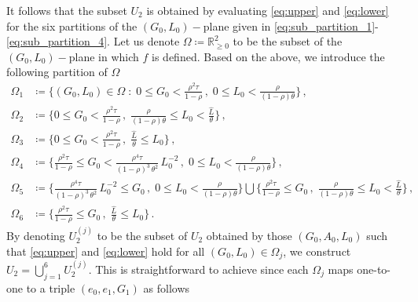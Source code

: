 \documentclass[a4paper,fleqn]{cas-sc}
\begin{document}
It follows that the subset $U_2$ is obtained by evaluating \eqref{eq:upper} and \eqref{eq:lower} for the six partitions of the $(G_0,L_0)-$plane given in \eqref{eq:sub_partition_1}-\eqref{eq:sub_partition_4}.
Let us denote $\Omega\coloneqq\mathbb{R}^2_{\geq0}$ to be the subset of the $(G_0,L_0)-$plane in which $f$ is defined.
Based on the above, we introduce the following partition of $\Omega$
%
\begin{subequations}\label{eq:partition_omega}
    \begin{align}
        \Omega_1&\coloneqq\bigg\{(G_0,L_0)\in\Omega\;:\; 0 \leq G_0 < \frac{\rho^2\tau}{1-\rho}\,, \;0 \leq L_0 < \frac{\rho}{(1-\rho)\theta}\bigg\}\,,\label{eq:partition_omega_1}\\
        \Omega_2&\coloneqq\bigg\{0 \leq G_0 < \frac{\rho^2\tau}{1-\rho}\,, \;\frac{\rho}{(1-\rho)\theta} \leq L_0 < \frac{\hat{L}}{\theta}\bigg\}\,,\label{eq:partition_omega_2}\\
        \Omega_3&\coloneqq\bigg\{0 \leq G_0 < \frac{\rho^2\tau}{1-\rho} \,, \; \frac{\hat{L}}{\theta}\leq L_0\bigg\}\,,\label{eq:partition_omega_3}\\
        \Omega_4&\coloneqq\bigg\{\frac{\rho^2\tau}{1-\rho} \leq G_0 < \frac{\rho^4\tau}{(1-\rho)^3\,\theta^2}\,L_0^{-2} \,, \;0 \leq L_0 < \frac{\rho}{(1-\rho)\theta}\bigg\}\,,\label{eq:partition_omega_4}\\
        \Omega_5&\coloneqq\bigg\{\frac{\rho^4\tau}{(1-\rho)^3\,\theta^2}\,L_0^{-2} \leq G_0 \,, \; 0 \leq L_0 < \frac{\rho}{(1-\rho)\theta}\bigg\} \bigcup \bigg\{\frac{\rho^2\tau}{1-\rho} \leq G_0 \,, \; \frac{\rho}{(1-\rho)\theta} \leq L_0 < \frac{\hat{L}}{\theta}\bigg\}\,,\label{eq:partition_omega_5}\\
        \Omega_6&\coloneqq\bigg\{\frac{\rho^2\tau}{1-\rho} \leq G_0 \,, \; \frac{\hat{L}}{\theta}\leq L_0\bigg\}\,.\label{eq:partition_omega_6}
    \end{align}
\end{subequations}
%
By denoting $U_2^{(j)}$ to be the subset of $U_2$ obtained by those $(G_0,A_0,L_0)$ such that \eqref{eq:upper} and \eqref{eq:lower} hold for all $(G_0,L_0)\in\Omega_j$, we construct $U_2=\bigcup_{j=1}^6 U_2^{(j)}$.
This is straightforward to achieve since each $\Omega_j$ maps one-to-one to a triple $(e_0,e_1,G_1)$ as follows
%
\end{document}
